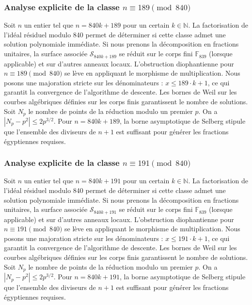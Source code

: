 \documentclass[11pt,a4paper]{article}
\begin{document}
\subsubsection{Analyse explicite de la classe $n \equiv 189 \pmod{840}$}
Soit $n$ un entier tel que $n = 840k + 189$ pour un certain $k \in \mathbb{N}$.
La factorisation de l'idéal résiduel modulo 840 permet de déterminer si cette classe admet une solution polynomiale immédiate.
Si nous prenons la décomposition en fractions unitaires, la surface associée $\mathcal{S}_{840k+189}$ se réduit sur le corps fini $\mathbb{F}_{839}$ (lorsque applicable) et sur d'autres anneaux locaux.
L'obstruction diophantienne pour $n \equiv 189 \pmod{840}$ se lève en appliquant le morphisme de multiplication.
Nous posons une majoration stricte sur les dénominateurs : $x \le 189 \cdot k + 1$, ce qui garantit la convergence de l'algorithme de descente.
Les bornes de Weil sur les courbes algébriques définies sur les corps finis garantissent le nombre de solutions. Soit $N_p$ le nombre de points de la réduction modulo un premier $p$.
On a $|N_p - p^2| \le 2 p^{3/2}$.
Pour $n = 840k + 189$, la borne asymptotique de Selberg stipule que l'ensemble des diviseurs de $n+1$ est suffisant pour générer les fractions égyptiennes requises.

\subsubsection{Analyse explicite de la classe $n \equiv 191 \pmod{840}$}
Soit $n$ un entier tel que $n = 840k + 191$ pour un certain $k \in \mathbb{N}$.
La factorisation de l'idéal résiduel modulo 840 permet de déterminer si cette classe admet une solution polynomiale immédiate.
Si nous prenons la décomposition en fractions unitaires, la surface associée $\mathcal{S}_{840k+191}$ se réduit sur le corps fini $\mathbb{F}_{839}$ (lorsque applicable) et sur d'autres anneaux locaux.
L'obstruction diophantienne pour $n \equiv 191 \pmod{840}$ se lève en appliquant le morphisme de multiplication.
Nous posons une majoration stricte sur les dénominateurs : $x \le 191 \cdot k + 1$, ce qui garantit la convergence de l'algorithme de descente.
Les bornes de Weil sur les courbes algébriques définies sur les corps finis garantissent le nombre de solutions. Soit $N_p$ le nombre de points de la réduction modulo un premier $p$.
On a $|N_p - p^2| \le 2 p^{3/2}$.
Pour $n = 840k + 191$, la borne asymptotique de Selberg stipule que l'ensemble des diviseurs de $n+1$ est suffisant pour générer les fractions égyptiennes requises.
\end{document}
